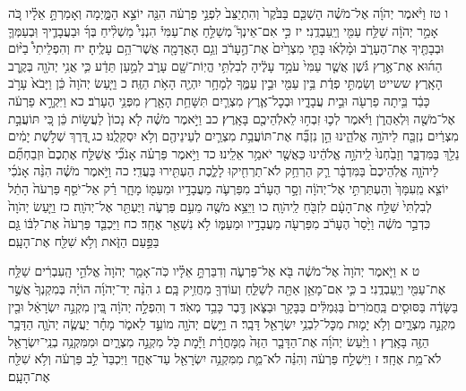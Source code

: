 \documentclass[twoside, openany, parskip=half, 11pt]{book}
\begin{document}
ו טז וַיֹּ֨אמֶר יְהֹוָ֜ה אֶל־מֹשֶׁ֗ה הַשְׁכֵּ֤ם בַּבֹּ֙קֶר֙ וְהִתְיַצֵּב֙ לִפְנֵ֣י פַרְעֹ֔ה הִנֵּ֖ה יוֹצֵ֣א הַמָּ֑יְמָה וְאָמַרְתָּ֣ אֵלָ֗יו כֹּ֚ה אָמַ֣ר יְהֹוָ֔ה שַׁלַּ֥ח עַמִּ֖י וְיַֽעַבְדֻֽנִי׃ יז כִּ֣י אִם־אֵינְךָ֮ מְשַׁלֵּ֣חַ אֶת־עַמִּי֒ הִנְנִי֩ מַשְׁלִ֨יחַ בְּךָ֜ וּבַעֲבָדֶ֧יךָ וּֽבְעַמְּךָ֛ וּבְבָתֶּ֖יךָ אֶת־הֶעָרֹ֑ב וּמָ֨לְא֜וּ בָּתֵּ֤י מִצְרַ֙יִם֙ אֶת־הֶ֣עָרֹ֔ב וְגַ֥ם הָאֲדָמָ֖ה אֲשֶׁר־הֵ֥ם עָלֶֽיהָ׃ יח וְהִפְלֵיתִי֩ בַיּ֨וֹם הַה֜וּא אֶת־אֶ֣רֶץ גֹּ֗שֶׁן אֲשֶׁ֤ר עַמִּי֙ עֹמֵ֣ד עָלֶ֔יהָ לְבִלְתִּ֥י הֱיֽוֹת־שָׁ֖ם עָרֹ֑ב לְמַ֣עַן תֵּדַ֔ע כִּ֛י אֲנִ֥י יְהֹוָ֖ה בְּקֶ֥רֶב הָאָֽרֶץ׃ ששייט וְשַׂמְתִּ֣י פְדֻ֔ת בֵּ֥ין עַמִּ֖י וּבֵ֣ין עַמֶּ֑ךָ לְמָחָ֥ר יִהְיֶ֖ה הָאֹ֥ת הַזֶּֽה׃ כ וַיַּ֤עַשׂ יְהֹוָה֙ כֵּ֔ן וַיָּבֹא֙ עָרֹ֣ב כָּבֵ֔ד בֵּ֥יתָה פַרְעֹ֖ה וּבֵ֣ית עֲבָדָ֑יו וּבְכׇל־אֶ֧רֶץ מִצְרַ֛יִם תִּשָּׁחֵ֥ת הָאָ֖רֶץ מִפְּנֵ֥י הֶעָרֹֽב׃ כא וַיִּקְרָ֣א פַרְעֹ֔ה אֶל־מֹשֶׁ֖ה וּֽלְאַהֲרֹ֑ן וַיֹּ֗אמֶר לְכ֛וּ זִבְח֥וּ לֵאלֹֽהֵיכֶ֖ם בָּאָֽרֶץ׃ כב וַיֹּ֣אמֶר מֹשֶׁ֗ה לֹ֤א נָכוֹן֙ לַעֲשׂ֣וֹת כֵּ֔ן כִּ֚י תּוֹעֲבַ֣ת מִצְרַ֔יִם נִזְבַּ֖ח לַיהֹוָ֣ה אֱלֹהֵ֑ינוּ הֵ֣ן נִזְבַּ֞ח אֶת־תּוֹעֲבַ֥ת מִצְרַ֛יִם לְעֵינֵיהֶ֖ם וְלֹ֥א יִסְקְלֻֽנוּ׃ כג דֶּ֚רֶךְ שְׁלֹ֣שֶׁת יָמִ֔ים נֵלֵ֖ךְ בַּמִּדְבָּ֑ר וְזָבַ֙חְנוּ֙ לַֽיהֹוָ֣ה אֱלֹהֵ֔ינוּ כַּאֲשֶׁ֖ר יֹאמַ֥ר אֵלֵֽינוּ׃ כד וַיֹּ֣אמֶר פַּרְעֹ֗ה אָנֹכִ֞י אֲשַׁלַּ֤ח אֶתְכֶם֙ וּזְבַחְתֶּ֞ם לַיהֹוָ֤ה אֱלֹֽהֵיכֶם֙ בַּמִּדְבָּ֔ר רַ֛ק הַרְחֵ֥ק לֹא־תַרְחִ֖יקוּ לָלֶ֑כֶת הַעְתִּ֖ירוּ בַּעֲדִֽי׃ כה וַיֹּ֣אמֶר מֹשֶׁ֗ה הִנֵּ֨ה אָנֹכִ֜י יוֹצֵ֤א מֵֽעִמָּךְ֙ וְהַעְתַּרְתִּ֣י אֶל־יְהֹוָ֔ה וְסָ֣ר הֶעָרֹ֗ב מִפַּרְעֹ֛ה מֵעֲבָדָ֥יו וּמֵעַמּ֖וֹ מָחָ֑ר רַ֗ק אַל־יֹסֵ֤ף פַּרְעֹה֙ הָתֵ֔ל לְבִלְתִּי֙ שַׁלַּ֣ח אֶת־הָעָ֔ם לִזְבֹּ֖חַ לַֽיהֹוָֽה׃ כו וַיֵּצֵ֥א מֹשֶׁ֖ה מֵעִ֣ם פַּרְעֹ֑ה וַיֶּעְתַּ֖ר אֶל־יְהֹוָֽה׃ כז וַיַּ֤עַשׂ יְהֹוָה֙ כִּדְבַ֣ר מֹשֶׁ֔ה וַיָּ֙סַר֙ הֶעָרֹ֔ב מִפַּרְעֹ֖ה מֵעֲבָדָ֣יו וּמֵעַמּ֑וֹ לֹ֥א נִשְׁאַ֖ר אֶחָֽד׃ כח וַיַּכְבֵּ֤ד פַּרְעֹה֙ אֶת־לִבּ֔וֹ גַּ֖ם בַּפַּ֣עַם הַזֹּ֑את וְלֹ֥א שִׁלַּ֖ח אֶת־הָעָֽם׃

ט א וַיֹּ֤אמֶר יְהֹוָה֙ אֶל־מֹשֶׁ֔ה בֹּ֖א אֶל־פַּרְעֹ֑ה וְדִבַּרְתָּ֣ אֵלָ֗יו כֹּֽה־אָמַ֤ר יְהֹוָה֙ אֱלֹהֵ֣י הָֽעִבְרִ֔ים שַׁלַּ֥ח אֶת־עַמִּ֖י וְיַֽעַבְדֻֽנִי׃ ב כִּ֛י אִם־מָאֵ֥ן אַתָּ֖ה לְשַׁלֵּ֑חַ וְעוֹדְךָ֖ מַחֲזִ֥יק בָּֽם׃ ג הִנֵּ֨ה יַד־יְהֹוָ֜ה הוֹיָ֗ה בְּמִקְנְךָ֙ אֲשֶׁ֣ר בַּשָּׂדֶ֔ה בַּסּוּסִ֤ים בַּֽחֲמֹרִים֙ בַּגְּמַלִּ֔ים בַּבָּקָ֖ר וּבַצֹּ֑אן דֶּ֖בֶר כָּבֵ֥ד מְאֹֽד׃ ד וְהִפְלָ֣ה יְהֹוָ֔ה בֵּ֚ין מִקְנֵ֣ה יִשְׂרָאֵ֔ל וּבֵ֖ין מִקְנֵ֣ה מִצְרָ֑יִם וְלֹ֥א יָמ֛וּת מִכׇּל־לִבְנֵ֥י יִשְׂרָאֵ֖ל דָּבָֽר׃ ה וַיָּ֥שֶׂם יְהֹוָ֖ה מוֹעֵ֣ד לֵאמֹ֑ר מָחָ֗ר יַעֲשֶׂ֧ה יְהֹוָ֛ה הַדָּבָ֥ר הַזֶּ֖ה בָּאָֽרֶץ׃ ו וַיַּ֨עַשׂ יְהֹוָ֜ה אֶת־הַדָּבָ֤ר הַזֶּה֙ מִֽמׇּחֳרָ֔ת וַיָּ֕מׇת כֹּ֖ל מִקְנֵ֣ה מִצְרָ֑יִם וּמִמִּקְנֵ֥ה בְנֵֽי־יִשְׂרָאֵ֖ל לֹא־מֵ֥ת אֶחָֽד׃ ז וַיִּשְׁלַ֣ח פַּרְעֹ֔ה וְהִנֵּ֗ה לֹא־מֵ֛ת מִמִּקְנֵ֥ה יִשְׂרָאֵ֖ל עַד־אֶחָ֑ד וַיִּכְבַּד֙ לֵ֣ב פַּרְעֹ֔ה וְלֹ֥א שִׁלַּ֖ח אֶת־הָעָֽם׃
\end{document}
